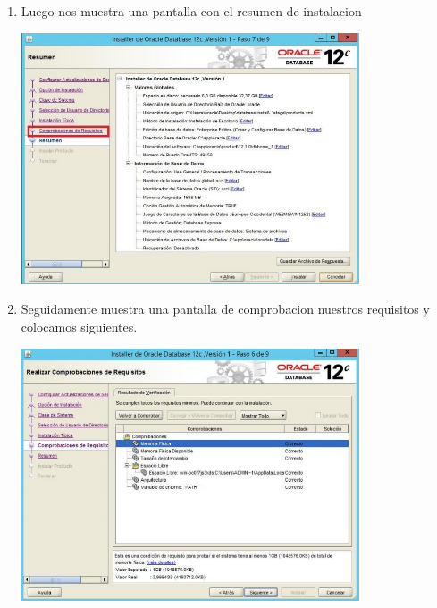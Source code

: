 \begin{enumerate}[1.]
\begin{center}
	\end{center}
          \item Luego nos muestra una pantalla con el resumen de instalacion
 	\begin{center}
	\includegraphics[width=10cm]{./Imagenes/bran7} 
	\end{center}
	\hfill \break
	\hfill \break
	\hfill \break
	\hfill \break
	\hfill \break
	\hfill \break
	\hfill \break
	\hfill \break
	\hfill \break
	\hfill \break
	\hfill \break
	\hfill \break
           \item Seguidamente muestra una pantalla de comprobacion nuestros requisitos y colocamos siguientes.
 	\begin{center}
	\includegraphics[width=10cm]{./Imagenes/bran8} 
	\end{center}
	
\end{enumerate} 
